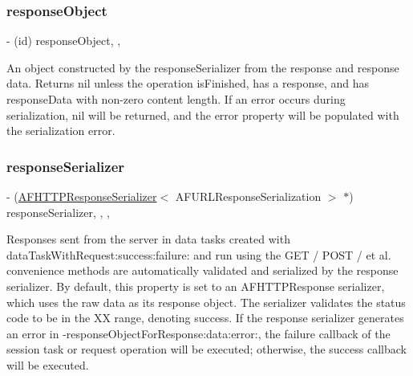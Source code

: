 \subsubsection{\texorpdfstring{response\+Object}{responseObject}}
{\footnotesize\ttfamily -\/ (id) response\+Object\hspace{0.3cm}{\ttfamily [read]}, {\ttfamily [nonatomic]}, {\ttfamily [strong]}}

An object constructed by the {\ttfamily response\+Serializer} from the response and response data. Returns {\ttfamily nil} unless the operation {\ttfamily is\+Finished}, has a {\ttfamily response}, and has {\ttfamily response\+Data} with non-\/zero content length. If an error occurs during serialization, {\ttfamily nil} will be returned, and the {\ttfamily error} property will be populated with the serialization error. \mbox{\label{interface_a_f_h_t_t_p_request_operation_a5b07813a0ff6ba379c5f98a9fb87b5a7}} 
\subsubsection{\texorpdfstring{response\+Serializer}{responseSerializer}}
{\footnotesize\ttfamily -\/ (\mbox{\hyperlink{interface_a_f_h_t_t_p_response_serializer}{A\+F\+H\+T\+T\+P\+Response\+Serializer}}$<$ A\+F\+U\+R\+L\+Response\+Serialization $>$ $\ast$) response\+Serializer\hspace{0.3cm}{\ttfamily [read]}, {\ttfamily [write]}, {\ttfamily [nonatomic]}, {\ttfamily [strong]}}

Responses sent from the server in data tasks created with {\ttfamily data\+Task\+With\+Request\+:success\+:failure\+:} and run using the {\ttfamily G\+ET} / {\ttfamily P\+O\+ST} / et al. convenience methods are automatically validated and serialized by the response serializer. By default, this property is set to an A\+F\+H\+T\+T\+P\+Response serializer, which uses the raw data as its response object. The serializer validates the status code to be in the {\+XX} range, denoting success. If the response serializer generates an error in {\ttfamily -\/response\+Object\+For\+Response\+:data\+:error\+:}, the {\ttfamily failure} callback of the session task or request operation will be executed; otherwise, the {\ttfamily success} callback will be executed.

